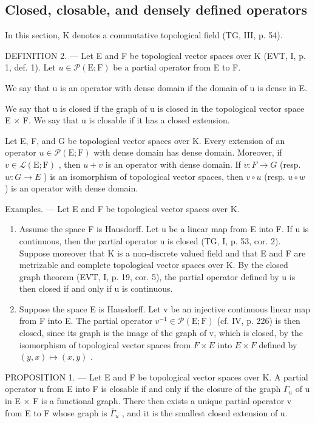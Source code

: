 \subsection{Closed, closable, and densely defined operators}

In this section, K denotes a commutative topological field (TG, III, p. 54).

DEFINITION 2. --- Let E and F be topological vector spaces over K (EVT, I, p. 1, def. 1). Let \(u \in \mathcal{P}(\mathrm{E};\mathrm{F})\) be a partial operator from E to F.

We say that u is an operator with dense domain if the domain of u is dense in E.

We say that u is closed if the graph of u is closed in the topological vector space E × F. We say that u is closable if it has a closed extension.

Let E, F, and G be topological vector spaces over K. Every extension of an operator \(u \in \mathcal{P}(\mathrm{E};\mathrm{F})\) with dense domain has dense domain. Moreover, if \(v \in \mathcal{L}(\mathrm{E};\mathrm{F})\) , then \(u + v\) is an operator with dense domain. If \(v: F \to G\) (resp. \(w: G \to E\) ) is an isomorphism of topological vector spaces, then \(v \circ u\) (resp. \(u \circ w\) ) is an operator with dense domain.

Examples. --- Let E and F be topological vector spaces over K.

\begin{enumerate}
\def\labelenumi{\arabic{enumi})}
\item
  Assume the space F is Hausdorff. Let u be a linear map from E into F. If u is continuous, then the partial operator u is closed (TG, I, p. 53, cor. 2). Suppose moreover that K is a non-discrete valued field and that E and F are metrizable and complete topological vector spaces over K. By the closed graph theorem (EVT, I, p. 19, cor. 5), the partial operator defined by u is then closed if and only if u is continuous.
\item
  Suppose the space E is Hausdorff. Let v be an injective continuous linear map from F into E. The partial operator \(v^{-1} \in \mathcal{P}(\mathrm{E};\mathrm{F})\) (cf. IV, p. 226) is then closed, since its graph is the image of the graph of v, which is closed, by the isomorphism of topological vector spaces from \(F \times E\) into \(E \times F\) defined by \((y,x) \mapsto (x,y)\) .
\end{enumerate}

PROPOSITION 1. --- Let E and F be topological vector spaces over K. A partial operator u from E into F is closable if and only if the closure of the graph \(\Gamma_{u}\) of u in E × F is a functional graph. There then exists a unique partial operator v from E to F whose graph is \(\overline{\Gamma}_{u}\) , and it is the smallest closed extension of u.

